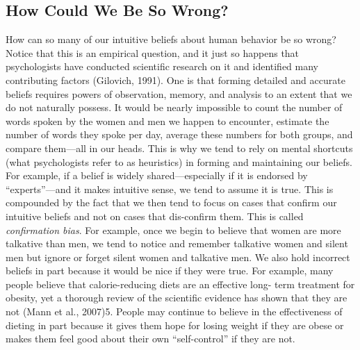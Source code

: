 \documentclass[]{book}
\theoremstyle{definition}
\theoremstyle{definition}
\theoremstyle{remark}
\begin{document}
\subsection{How Could We Be So Wrong?}\label{how-could-we-be-so-wrong}

How can so many of our intuitive beliefs about human behavior be so
wrong? Notice that this is an empirical question, and it just so happens
that psychologists have conducted scientific research on it and
identified many contributing factors (Gilovich, 1991). One is that
forming detailed and accurate beliefs requires powers of observation,
memory, and analysis to an extent that we do not naturally possess. It
would be nearly impossible to count the number of words spoken by the
women and men we happen to encounter, estimate the number of words they
spoke per day, average these numbers for both groups, and compare
them---all in our heads. This is why we tend to rely on mental shortcuts
(what psychologists refer to as heuristics) in forming and maintaining
our beliefs. For example, if a belief is widely shared---especially if
it is endorsed by ``experts''---and it makes intuitive sense, we tend to
assume it is true. This is compounded by the fact that we then tend to
focus on cases that confirm our intuitive beliefs and not on cases that
dis-confirm them. This is called \emph{confirmation bias}. For example,
once we begin to believe that women are more talkative than men, we tend
to notice and remember talkative women and silent men but ignore or
forget silent women and talkative men. We also hold incorrect beliefs in
part because it would be nice if they were true. For example, many
people believe that calorie-reducing diets are an effective long- term
treatment for obesity, yet a thorough review of the scientific evidence
has shown that they are not (Mann et al., 2007)5. People may continue to
believe in the effectiveness of dieting in part because it gives them
hope for losing weight if they are obese or makes them feel good about
their own ``self-control'' if they are not.
\end{document}
